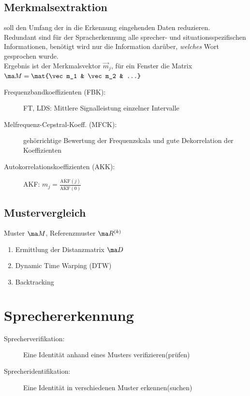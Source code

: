 \documentclass[fs, footer]{latex4ei}
\begin{document}
\begin{multicols*}{4}
	\subsection{Merkmalsextraktion}
	soll den Umfang der in die Erkennung eingehenden Daten reduzieren.\\
	Redundant sind für der Spracherkennung alle sprecher- und situationsspezifischen
	Informationen, benötigt wird nur die Information darüber, \emph{welches} Wort gesprochen wurde.\\
	Ergebnis ist der Merkmalsvektor $\vec m_j$, für ein Fenster die Matrix $\ma M = \mat{\vec m_1 & \vec m_2 & ...}$
	
	\begin{description}
		\item[Frequenzbandkoeffizienten (FBK):] FT, LDS: Mittlere Signalleistung einzelner Intervalle
		\item[Melfrequenz-Cepstral-Koeff. (MFCK):] gehörrichtige Bewertung der Frequenzskala und gute Dekorrelation der Koeffizienten
		\item[Autokorrelationskoeffizienten (AKK):] AKF: $m_j = \frac{\overline{\text{AKF}}(j)}{\overline{\text{AKF}}(0)}$
	\end{description}


	\subsection{Mustervergleich}
	Muster $\ma M$, Referenzmuster $\ma R^{(k)}$
	\begin{enumerate}
		\item Ermittlung der Distanzmatrix $\ma D$
		\item Dynamic Time Warping (DTW)
		\item Backtracking
	\end{enumerate}



\section{Sprechererkennung}
\begin{description}
	\item[Sprecherverifikation:] Eine Identität anhand eines Musters verifizieren(prüfen)
	\item[Sprecheridentifikation:] Eine Identität in verschiedenen Muster erkennen(suchen)
\end{description}



\end{multicols*}
\end{document}
